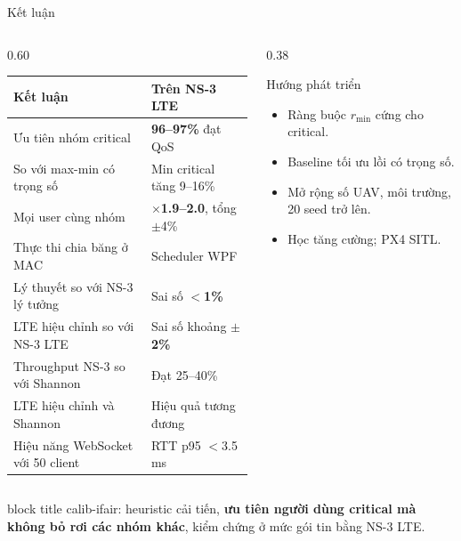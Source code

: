 \documentclass[aspectratio=169,10pt,t]{beamer}
\newcommand{\good}[1]{\textcolor{Good}{\textbf{#1}}}
\begin{document}
\begin{frame}{Kết luận}
\begin{columns}[T,onlytextwidth]
\begin{column}{0.60\textwidth}
\vspace{0pt}
  \footnotesize
  \renewcommand{\arraystretch}{1.1}
  \begin{tabularx}{\linewidth}{@{}>{\raggedright\arraybackslash}Xl@{}}
    \toprule
    \textbf{Kết luận} & \textbf{Trên NS-3 LTE}\\
    \midrule
    Ưu tiên nhóm critical & \good{96--97\%} đạt QoS\\
    So với max-min có trọng số & Min critical tăng 9--16\%\\
    Mọi user cùng nhóm & \good{$\times$1.9--2.0}, tổng $\pm$4\%\\
    Thực thi chia băng ở MAC & Scheduler WPF\\
    Lý thuyết so với NS-3 lý tưởng & Sai số \good{$<$1\%}\\
    LTE hiệu chỉnh so với NS-3 LTE & Sai số khoảng \good{$\pm$2\%}\\
    Throughput NS-3 so với Shannon & Đạt 25--40\%\\
    LTE hiệu chỉnh và Shannon & Hiệu quả tương đương\\
    Hiệu năng WebSocket với 50 client & RTT p95 $<$3.5 ms\\
    \bottomrule
  \end{tabularx}
\end{column}
\begin{column}{0.38\textwidth}
\vspace{0pt}
  \begin{block}{Hướng phát triển}
    \small
    \begin{itemize}
      \item Ràng buộc $r_{\min}$ cứng cho critical.
      \item Baseline tối ưu lồi có trọng số.
      \item Mở rộng số UAV, môi trường, 20 seed trở lên.
      \item Học tăng cường; PX4 SITL.
    \end{itemize}
  \end{block}
\end{column}
\end{columns}

\vspace{2mm}
\begin{beamercolorbox}[sep=2mm,rounded=true]{block title}
  \small
  calib-ifair: heuristic cải tiến, \textbf{ưu tiên người dùng critical mà không bỏ rơi các nhóm khác}, kiểm chứng ở mức gói tin bằng NS-3 LTE.
\end{beamercolorbox}
\end{frame}
\end{document}
